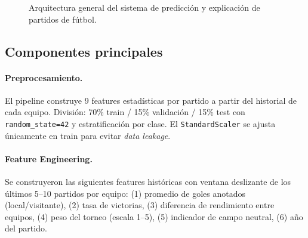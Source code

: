 \documentclass[10pt,twocolumn]{article}
\begin{document}
\begin{figure}[H]
  \centering
  \caption{Arquitectura general del sistema de predicción y
           explicación de partidos de fútbol.}
  \label{fig:arq}
\end{figure}

\subsection{Componentes principales}

\paragraph{Preprocesamiento.}
El pipeline construye 9 features estadísticas por partido a partir
del historial de cada equipo. División: 70\% train / 15\% validación
/ 15\% test con \texttt{random\_state=42} y estratificación por
clase. El \texttt{StandardScaler} se ajusta únicamente en train para
evitar \textit{data leakage}.

\paragraph{Feature Engineering.}
Se construyeron las siguientes features históricas con ventana
deslizante de los últimos 5--10 partidos por equipo:
(1) promedio de goles anotados (local/visitante),
(2) tasa de victorias,
(3) diferencia de rendimiento entre equipos,
(4) peso del torneo (escala 1--5),
(5) indicador de campo neutral,
(6) año del partido.
\end{document}
